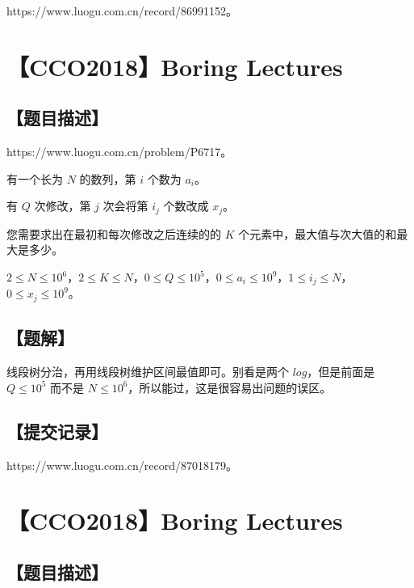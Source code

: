 \documentclass[UTF8,12pt,a4paper]{ctexart}
\begin{document}
	https://www.luogu.com.cn/record/86991152。
	
	
	\section*{【CCO2018】Boring Lectures}
	
	\subsection*{【题目描述】}
	
	https://www.luogu.com.cn/problem/P6717。
	
	有一个长为 $N$ 的数列，第 $i$ 个数为 $a_i$。
	
	有 $Q$ 次修改，第 $j$ 次会将第 $i_j$ 个数改成 $x_j$。
	
	您需要求出在最初和每次修改之后连续的的 $K$ 个元素中，最大值与次大值的和最大是多少。
	
	$2 \le N \le 10^6$，$2 \le K \le N$，$0 \le Q \le 10^5$，$0 \le a_i \le 10^9$，$1 \le i_j \le N$，$0 \le x_j \le 10^9$。
	
	\subsection*{【题解】}
	
	线段树分治，再用线段树维护区间最值即可。别看是两个 $log$，但是前面是 $Q\le 10^5$ 而不是 $N\le 10^6$，所以能过，这是很容易出问题的误区。
	
	\subsection*{【提交记录】}
	
	https://www.luogu.com.cn/record/87018179。
	
	
	\section*{【CCO2018】Boring Lectures}
	
	\subsection*{【题目描述】}
	
\end{document}
